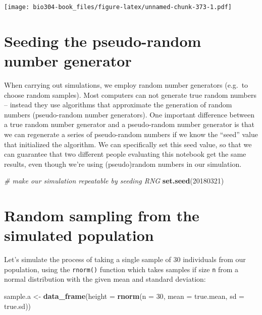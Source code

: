 \documentclass[]{book}
\newenvironment{Shaded}{\begin{snugshade}}{\end{snugshade}}
\newcommand{\CommentTok}[1]{\textcolor[rgb]{0.56,0.35,0.01}{\textit{#1}}}
\newcommand{\DataTypeTok}[1]{\textcolor[rgb]{0.13,0.29,0.53}{#1}}
\newcommand{\DecValTok}[1]{\textcolor[rgb]{0.00,0.00,0.81}{#1}}
\newcommand{\KeywordTok}[1]{\textcolor[rgb]{0.13,0.29,0.53}{\textbf{#1}}}
\newcommand{\NormalTok}[1]{#1}
\newcommand{\StringTok}[1]{\textcolor[rgb]{0.31,0.60,0.02}{#1}}
\theoremstyle{definition}
\theoremstyle{definition}
\theoremstyle{definition}
\theoremstyle{remark}
\begin{document}
\texttt{[image: bio304-book\_files/figure-latex/unnamed-chunk-373-1.pdf]}

\hypertarget{seeding-the-pseudo-random-number-generator}{%
\section{Seeding the pseudo-random number
generator}\label{seeding-the-pseudo-random-number-generator}}

When carrying out simulations, we employ random number generators
(e.g.~to choose random samples). Most computers can not generate true
random numbers -- instead they use algorithms that approximate the
generation of random numbers (pseudo-random number generators). One
important difference between a true random number generator and a
pseudo-random number generator is that we can regenerate a series of
pseudo-random numbers if we know the ``seed'' value that initialized the
algorithm. We can specifically set this seed value, so that we can
guarantee that two different people evaluating this notebook get the
same results, even though we're using (pseudo)random numbers in our
simulation.

\begin{Shaded}
\begin{Highlighting}[]
\CommentTok{# make our simulation repeatable by seeding RNG}
\KeywordTok{set.seed}\NormalTok{(}\DecValTok{20180321}\NormalTok{)}
\end{Highlighting}
\end{Shaded}

\hypertarget{random-sampling-from-the-simulated-population}{%
\section{Random sampling from the simulated
population}\label{random-sampling-from-the-simulated-population}}

Let's simulate the process of taking a single sample of 30 individuals
from our population, using the \texttt{rnorm()} function which takes
samples if size \texttt{n} from a normal distribution with the given
mean and standard deviation:

\begin{Shaded}
\begin{Highlighting}[]
\NormalTok{sample.a <-}
\StringTok{  }\KeywordTok{data_frame}\NormalTok{(}\DataTypeTok{height =} \KeywordTok{rnorm}\NormalTok{(}\DataTypeTok{n =} \DecValTok{30}\NormalTok{, }\DataTypeTok{mean =}\NormalTok{ true.mean, }\DataTypeTok{sd =}\NormalTok{ true.sd))}
\end{Highlighting}
\end{Shaded}
\end{document}
